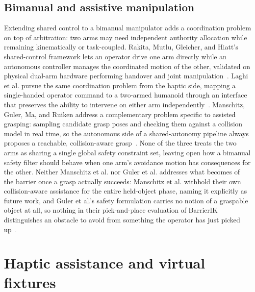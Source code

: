 \documentclass[12pt,a4paper,twoside,openright]{report}
\begin{document}
\subsection{Bimanual and assistive manipulation}
\label{sec:sota-bimanual}

Extending shared control to a bimanual manipulator adds a coordination problem on top of arbitration: two arms may need independent authority allocation while remaining kinematically or task-coupled. Rakita, Mutlu, Gleicher, and Hiatt's shared-control framework lets an operator drive one arm directly while an autonomous controller manages the coordinated motion of the other, validated on physical dual-arm hardware performing handover and joint manipulation~\cite{rakita2019bimanual}. Laghi et al. pursue the same coordination problem from the haptic side, mapping a single-handed operator command to a two-armed humanoid through an interface that preserves the ability to intervene on either arm independently~\cite{laghi2018bimanual}. Manschitz, Guler, Ma, and Ruiken address a complementary problem specific to assisted grasping: sampling candidate grasp poses and checking them against a collision model in real time, so the autonomous side of a shared-autonomy pipeline always proposes a reachable, collision-aware grasp~\cite{manschitz2025samplinggrasp}. None of the three treats the two arms as sharing a single global safety constraint set, leaving open how a bimanual safety filter should behave when one arm's avoidance motion has consequences for the other. Neither Manschitz et al. nor Guler et al. addresses what becomes of the barrier once a grasp actually succeeds: Manschitz et al. withhold their own collision-aware assistance for the entire held-object phase, naming it explicitly as future work, and Guler et al.'s safety formulation carries no notion of a graspable object at all, so nothing in their pick-and-place evaluation of BarrierIK distinguishes an obstacle to avoid from something the operator has just picked up~\cite{guler2026barrierik}.

\section{Haptic assistance and virtual fixtures}
\label{sec:sota-haptic-fixtures}
\end{document}
